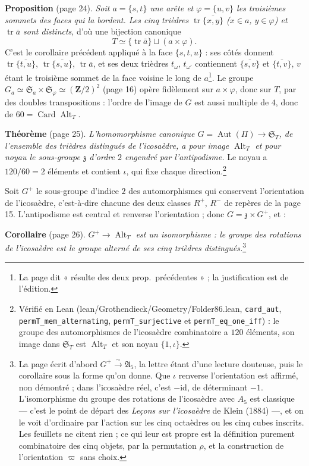 \documentclass[11pt,a4paper]{article}
\begin{document}
\textbf{Proposition} (page 24). \emph{Soit $a = \{s, t\}$ une arête et
$\varphi = \{u, v\}$ les troisièmes sommets des faces qui la bordent. Les cinq
trièdres $\operatorname{tr}\overline{\{x, y\}}$ ($x \in a$, $y \in \varphi$)
et $\operatorname{tr}\bar a$ sont distincts}, d'où une bijection canonique
\[
T \simeq \{\operatorname{tr}\bar a\} \sqcup (a \times \varphi).
\]
C'est le corollaire précédent appliqué à la face $\{s, t, u\}$ : ses côtés
donnent $\operatorname{tr}\overline{\{t,u\}}$, $\operatorname{tr}
\overline{\{s,u\}}$, $\operatorname{tr}\bar a$, et ses deux trièdres
$t_\omega$, $t_{\omega'}$ contiennent $\overline{\{s, v\}}$ et $\overline{\{t,
v\}}$, $v$ étant le troisième sommet de la face voisine le long de
$a$\footnote{La page dit « résulte des deux prop.\ précédentes » ; la
justification est de l'édition.}. Le groupe $G_a \simeq \mathfrak{S}_a \times
\mathfrak{S}_\varphi \simeq (\mathbf{Z}/2)^2$ (page 16) opère fidèlement sur
$a \times \varphi$, donc sur $T$, par des doubles transpositions : l'ordre de
l'image de $G$ est aussi multiple de $4$, donc de $60 =
\operatorname{Card}\operatorname{Alt}_T$.

\textbf{Théorème} (page 25). \emph{L'homomorphisme canonique $G =
\operatorname{Aut}(\Pi) \to \mathfrak{S}_T$, de l'ensemble des trièdres
distingués de l'icosaèdre, a pour image $\operatorname{Alt}_T$ et pour noyau
le sous-groupe $\mathfrak{z}$ d'ordre $2$ engendré par l'antipodisme.} Le
noyau a $120/60 = 2$ éléments et contient $\iota$, qui fixe chaque
direction.\footnote{Vérifié en Lean (lean/Grothendieck/Geometry/Folder86.lean,
\texttt{card\_aut}, \texttt{permT\_mem\_alternating},
\texttt{permT\_surjective} et \texttt{permT\_eq\_one\_iff}) : le groupe des
automorphismes de l'icosaèdre combinatoire a $120$ éléments, son image dans
$\mathfrak{S}_T$ est $\operatorname{Alt}_T$ et son noyau $\{1, \iota\}$.}

Soit $G^{+}$ le sous-groupe d'indice $2$ des automorphismes qui conservent
l'orientation de l'icosaèdre, c'est-à-dire chacune des deux classes $R^{+}$,
$R^{-}$ de repères de la page 15. L'antipodisme est central et renverse
l'orientation ; donc $G = \mathfrak{z} \times G^{+}$, et :

\textbf{Corollaire} (page 26). \emph{$G^{+} \to \operatorname{Alt}_T$ est un
isomorphisme : le groupe des rotations de l'icosaèdre est le groupe alterné
de ses cinq trièdres distingués.}\footnote{La page écrit d'abord
$G^{+} \xrightarrow{\sim} \mathfrak{A}_5$, la lettre étant d'une lecture
douteuse, puis le corollaire sous la forme qu'on donne. Que $\iota$ renverse
l'orientation est affirmé, non démontré ; dans l'icosaèdre réel, c'est
$-\mathrm{id}$, de déterminant $-1$. L'isomorphisme du groupe des rotations de
l'icosaèdre avec $A_5$ est classique --- c'est le point de départ des
\emph{Leçons sur l'icosaèdre} de Klein (1884) ---, et on le voit d'ordinaire
par l'action sur les cinq octaèdres ou les cinq cubes inscrits. Les feuillets
ne citent rien ; ce qui leur est propre est la définition purement
combinatoire des cinq objets, par la permutation $\rho$, et la construction de
l'orientation $\varpi$ sans choix.}
\end{document}
